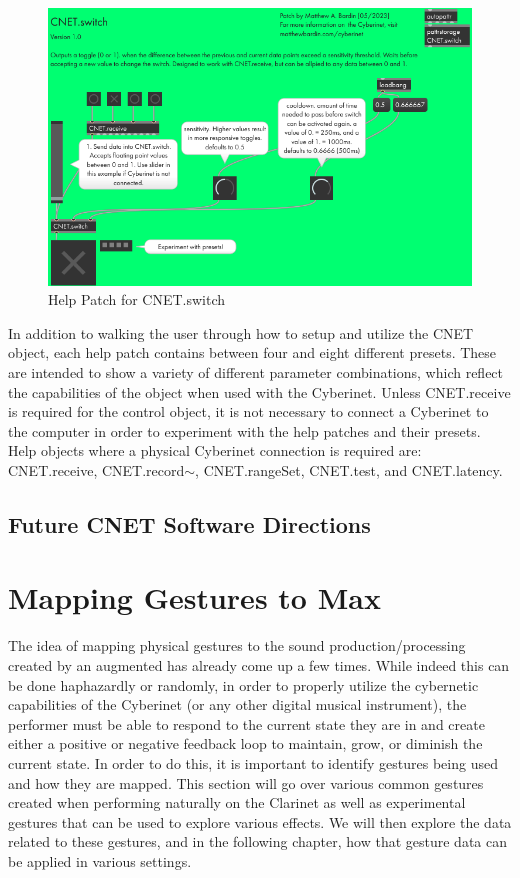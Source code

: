 \begin{figure}
    \centering
    \includegraphics{diagrams/maxPatches/switchHelp.png}
    \caption{Help Patch for CNET.switch}
    \label{fig:switchHelp1}
\end{figure}

In addition to walking the user through how to setup and utilize the CNET object, each help patch contains between four and eight different presets. These are intended to show a variety of different parameter combinations, which reflect the capabilities of the object when used with the Cyberinet. Unless CNET.receive is required for the control object, it is not necessary to connect a Cyberinet to the computer in order to experiment with the help patches and their presets. Help objects where a physical Cyberinet connection is required are: CNET.receive, CNET.record$\sim$, CNET.rangeSet, CNET.test, and CNET.latency.


\subsection{Future CNET Software Directions}



\section{Mapping Gestures to Max} %

The idea of mapping physical gestures to the sound production/processing created by an augmented has already come up a few times. While indeed this can be done haphazardly or randomly, in order to properly utilize the cybernetic capabilities of the Cyberinet (or any other digital musical instrument), the performer must be able to respond to the current state they are in and create either a positive or negative feedback loop to maintain, grow, or diminish the current state. In order to do this, it is important to identify gestures being used and how they are mapped. This section will go over various common gestures created when performing naturally on the Clarinet as well as experimental gestures that can be used to explore various effects. We will then explore the data related to these gestures, and in the following chapter, how that gesture data can be applied in various settings.

